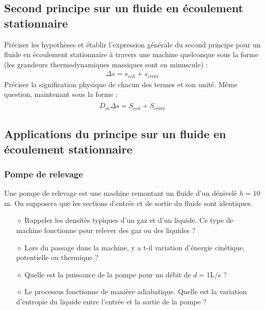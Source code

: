 \documentclass{report}
\begin{document}
\subsection*{Second principe sur un fluide en écoulement stationnaire}

Préciser les hypothèses et établir l'expression générale du second principe pour un fluide en écoulement stationnaire à travers une machine quelconque sous la forme (les grandeurs thermodynamiques massiques sont en minuscule) :
\begin{align*}
	\Delta s=s_{ech}+s_{créée}
\end{align*}
Préciser la signification physique de chacun des termes et son unité.
Même question, maintenant sous la forme :
\begin{align*}
	D_m\Delta s=\dot{S}_{ech}+\dot{S}_{créée}
\end{align*}

\subsection*{Applications du principe sur un fluide en écoulement stationnaire}

\subsubsection*{Pompe de relevage}

Une pompe de relevage est une machine remontant un fluide d'un dénivelé $h=10$m. On supposera que les sections d'entrée et de sortie du fluide sont identiques. 

\begin{itemize}

	\item[$\diamond$] Rappeler les densités typiques d'un gaz et d'un liquide. Ce type de machine fonctionne pour relever des gaz ou des liquides ?
	
	\item[$\diamond$] Lors du passage dans la machine, y a t-il variation d'énergie cinétique, potentielle ou thermique ?
	
	\item[$\diamond$] Quelle est la puissance de la pompe pour un débit de $d=$1L/s ? 
	
	\item[$\diamond$] Le processus fonctionne de manière adiabatique. Quelle est la variation d'entropie du liquide entre l'entrée et la sortie de la pompe ?

\end{itemize}
\end{document}
